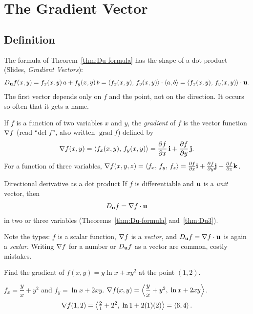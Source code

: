 \section{The Gradient Vector}\label{ch:gradient}

\subsection{Definition}

The formula of Theorem~\ref{thm:Du-formula} has the shape of a dot product
(Slides, \emph{Gradient Vectors}):
\[
  D_{\mathbf{u}} f(x,y)=f_x(x,y)\,a+f_y(x,y)\,b=\left\langle f_x(x,y),\,f_y(x,y) \right\rangle\cdot\left\langle a,b \right\rangle
  =\left\langle f_x(x,y),\,f_y(x,y) \right\rangle\cdot\mathbf{u} .
\]
The first vector depends only on $f$ and the point, not on the direction. It
occurs so often that it gets a name.

\begin{definition}\label{def:grad}
If $f$ is a function of two variables $x$ and $y$, the \emph{gradient} of $f$
is the vector function $\nabla f$ (read ``del $f$'', also written
$\operatorname{grad}f$) defined by
\[
  \nabla f(x,y)=\left\langle f_x(x,y),\,f_y(x,y) \right\rangle=\frac{\partial f}{\partial x}\,\mathbf{i}+\frac{\partial f}{\partial y}\,\mathbf{j} .
\]
For a function of three variables,
$\nabla f(x,y,z)=\left\langle f_x,\,f_y,\,f_z \right\rangle=\frac{\partial f}{\partial x}\mathbf{i}+\frac{\partial f}{\partial y}\mathbf{j}+\frac{\partial f}{\partial z}\mathbf{k}$.
\end{definition}

\begin{keybox}{Directional derivative as a dot product}
If $f$ is differentiable and $\mathbf{u}$ is a \emph{unit} vector, then
\[
  D_{\mathbf{u}} f=\nabla f\cdot\mathbf{u}
\]
in two or three variables (Theorems~\ref{thm:Du-formula} and~\ref{thm:Du3}).
\end{keybox}

Note the types: $f$ is a scalar function, $\nabla f$ is a \emph{vector}, and
$D_{\mathbf{u}} f=\nabla f\cdot\mathbf{u}$ is again a \emph{scalar}. Writing $\nabla f$ for a number
or $D_{\mathbf{u}} f$ as a vector are common, costly mistakes.

\begin{example}\label{ex:6.3}
Find the gradient of $f(x,y)=y\ln x+xy^2$ at the point $(1,2)$.
\end{example}
\begin{solution}
 $f_x=\dfrac{y}{x}+y^2$ and $f_y=\ln x+2xy$.
 $\nabla f(x,y)=\left\langle \dfrac yx+y^2,\;\ln x+2xy \right\rangle$.
\[
  \nabla f(1,2)=\left\langle \tfrac21+2^2,\;\ln1+2(1)(2) \right\rangle=\left\langle 6,4 \right\rangle.
\]
\end{solution}

